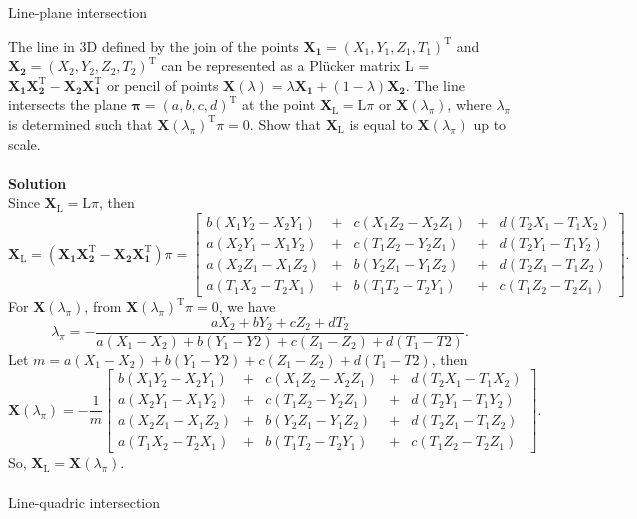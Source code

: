 \documentclass{../../assignment}
\date{\today}
\begin{document}
\begin{problemlist}

\pbitem Line-plane intersection

The line in 3D defined by the join of the points $\mathbf{X_1} = (X_1,Y_1,Z_1,T_1)^ \mathrm{T}$ and $\mathbf{X_2} = (X_2,Y_2,Z_2,T_2)^ \mathrm{T}$ can be represented as a Pl\"ucker matrix L = $\mathbf{X_1X_2^ \mathrm{T} - X_2X_1^ \mathrm{T}}$ or pencil of points $\mathbf{X}(\lambda) = \lambda\mathbf{X_1} + (1 - \lambda)\mathbf{X_2}$. The line intersects the plane $\mathbf{\pi} = (a,b,c,d)^\mathrm{T}$ at the point $\mathbf{X_\mathrm{L}} = \mathrm{L}\pi$ or $\mathbf{X}(\lambda_\pi)$, where $\lambda_\pi$ is determined such that $\mathbf{X}(\lambda_\pi)^\mathrm{T}\pi = 0$. Show that $\mathbf{X}_\mathrm{L}$ is equal to $\mathbf{X}(\lambda_\pi)$ up to scale.
\\
\\
\textbf{Solution}\\
Since $\mathbf{X_\mathrm{L}} = \mathrm{L}\pi$, then
\[ \mathbf{X_\mathrm{L}} = (\mathbf{X_1X_2^ \mathrm{T} - X_2X_1^ \mathrm{T}})\pi =
\begin{bmatrix}
b(X_1Y_2-X_2Y_1)&+&c(X_1Z_2 - X_2Z_1)&+&d(T_2X_1 - T_1X_2)\\
a(X_2Y_1-X_1Y_2)&+&c(T_1Z_2 - Y_2Z_1)&+&d(T_2Y_1 - T_1Y_2)\\
a(X_2Z_1-X_1Z_2)&+&b(Y_2Z_1 - Y_1Z_2)&+&d(T_2Z_1 - T_1Z_2)\\
a(T_1X_2-T_2X_1)&+&b(T_1T_2 - T_2Y_1)&+&c(T_1Z_2 - T_2Z_1)\end{bmatrix}.\]
For $\mathbf{X}(\lambda_\pi)$, from $\mathbf{X}(\lambda_\pi)^\mathrm{T}\pi = 0$, we have
\[ \lambda_\pi = -\frac{aX_2+bY_2+cZ_2+dT_2}{a(X_1-X_2)+b(Y_1-Y2)+c(Z_1-Z_2)+d(T_1-T2)}.\]Let $m = a(X_1-X_2)+b(Y_1-Y2)+c(Z_1-Z_2)+d(T_1-T2)$, then
\[\mathbf{X}(\lambda_\pi) = -\frac{1}{m}
\begin{bmatrix}
b(X_1Y_2-X_2Y_1)&+&c(X_1Z_2 - X_2Z_1)&+&d(T_2X_1 - T_1X_2)\\
a(X_2Y_1-X_1Y_2)&+&c(T_1Z_2 - Y_2Z_1)&+&d(T_2Y_1 - T_1Y_2)\\
a(X_2Z_1-X_1Z_2)&+&b(Y_2Z_1 - Y_1Z_2)&+&d(T_2Z_1 - T_1Z_2)\\
a(T_1X_2-T_2X_1)&+&b(T_1T_2 - T_2Y_1)&+&c(T_1Z_2 - T_2Z_1)\end{bmatrix}.
\]
So, $\mathbf{X}_\mathrm{L} = \mathbf{X}(\lambda_\pi)$.
\\\\
\pbitem Line-quadric intersection


\end{problemlist}
\end{document}
